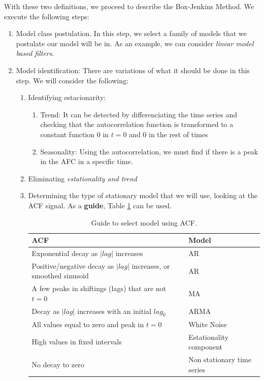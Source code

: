 With these two definitions, we proceed to describe the Box-Jenkins Method. We execute the following steps:

\begin{enumerate}
  \item Model class postulation. In this step, we select a family of models that we postulate our model will be in. As an example, we can consider \emph{linear model based filters}.

  \item Model identification: There are variations of what it should be done in this step. We will consider the following:
        \begin{enumerate}
          \item Identifying estacionarity:
                \begin{enumerate}
                  \item Trend: It can be detected by differenciating the time series and checking that the autocorrelation function is transformed to a constant function \(0\) in \(t = 0\) and \(0\) in the rest of times
                        \item Seasonality: Using the autocorrelation, we must find if there is a peak in the AFC in a specific time.
                \end{enumerate}
          \item Eliminating \emph{estationality and trend}

          \item Determining the type of stationary model that we will use, looking at the ACF signal. As a \textbf{guide}, Table \ref{acf:select:model} can be used.

                \begin{table}[H]
\begin{tabular}{l|l}
ACF                                                                  & Model                      \\ \hline
Exponential decay as \(|lag|\) increases                             & AR                         \\
Positive/negative decay as \(|lag|\) increases, or smoothed sinusoid & AR                         \\
A few peaks in shiftings (lags) that are not \(t = 0\)               & MA                         \\
Decay as \(|lag|\) increases with an initial \(lag_0\)               & ARMA                       \\
All values equal to zero and peak in \(t = 0\)                       & White Noise                \\
High values in fixed intervals                                       & Estationality component    \\
No decay to zero                                                     & Non stationary time series
\end{tabular}
\caption{Guide to select model using ACF.}
\label{acf:select:model}
\end{table}
        \end{enumerate}

\end{enumerate}

